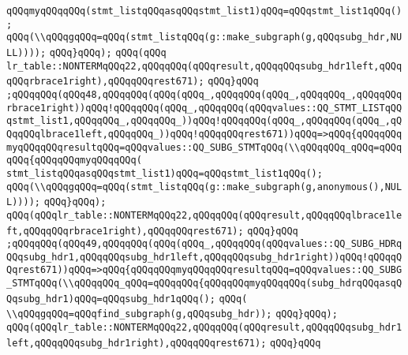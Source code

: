 \verb|qQQqmyqQQqqQQq(stmt_listqQQqasqQQqstmt_list1)qQQq=qQQqstmt_list1qQQq();|\newline
\verb|qQQq(\\qQQqgqQQq=qQQq(stmt_listqQQq(g::make_subgraph(g,qQQqsubg_hdr,NULL))));|\newline
\verb|qQQq}qQQq);|\newline
\verb|qQQq(qQQq|\newline
\verb|lr_table::NONTERMqQQq22,qQQqqQQq(qQQqresult,qQQqqQQqsubg_hdr1left,qQQqqQQqrbrace1right),qQQqqQQqrest671);|\newline
\verb|qQQq}qQQq|\newline
\verb|;qQQqqQQq(qQQq48,qQQqqQQq(qQQq(qQQq_,qQQqqQQq(qQQq_,qQQqqQQq_,qQQqqQQqrbrace1right))qQQq!qQQqqQQq(qQQq_,qQQqqQQq(qQQqvalues::QQ_STMT_LISTqQQqstmt_list1,qQQqqQQq_,qQQqqQQq_))qQQq!qQQqqQQq(qQQq_,qQQqqQQq(qQQq_,qQQqqQQqlbrace1left,qQQqqQQq_))qQQq!qQQqqQQqrest671))qQQq=>qQQq{qQQqqQQqmyqQQqqQQqresultqQQq=qQQqvalues::QQ_SUBG_STMTqQQq(\\qQQqqQQq_qQQq=qQQqqQQq{qQQqqQQqmyqQQqqQQq(|\newline
\verb|stmt_listqQQqasqQQqstmt_list1)qQQq=qQQqstmt_list1qQQq();|\newline
\verb|qQQq(\\qQQqgqQQq=qQQq(stmt_listqQQq(g::make_subgraph(g,anonymous(),NULL))));|\newline
\verb|qQQq}qQQq);|\newline
\verb|qQQq(qQQqlr_table::NONTERMqQQq22,qQQqqQQq(qQQqresult,qQQqqQQqlbrace1left,qQQqqQQqrbrace1right),qQQqqQQqrest671);|\newline
\verb|qQQq}qQQq|\newline
\verb|;qQQqqQQq(qQQq49,qQQqqQQq(qQQq(qQQq_,qQQqqQQq(qQQqvalues::QQ_SUBG_HDRqQQqsubg_hdr1,qQQqqQQqsubg_hdr1left,qQQqqQQqsubg_hdr1right))qQQq!qQQqqQQqrest671))qQQq=>qQQq{qQQqqQQqmyqQQqqQQqresultqQQq=qQQqvalues::QQ_SUBG_STMTqQQq(\\qQQqqQQq_qQQq=qQQqqQQq{qQQqqQQqmyqQQqqQQq(subg_hdrqQQqasqQQqsubg_hdr1)qQQq=qQQqsubg_hdr1qQQq();|\newline
\verb|qQQq(|\newline
\verb|\\qQQqgqQQq=qQQqfind_subgraph(g,qQQqsubg_hdr));|\newline
\verb|qQQq}qQQq);|\newline
\verb|qQQq(qQQqlr_table::NONTERMqQQq22,qQQqqQQq(qQQqresult,qQQqqQQqsubg_hdr1left,qQQqqQQqsubg_hdr1right),qQQqqQQqrest671);|\newline
\verb|qQQq}qQQq|\newline
